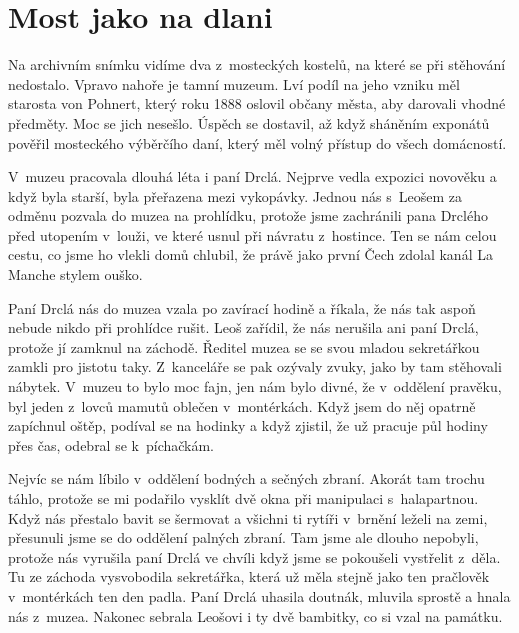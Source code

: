 
\chapter{Most jako na dlani}

Na archivním snímku vidíme dva z~mosteckých kostelů, na které se při stěhování
nedostalo. Vpravo nahoře je tamní muzeum. Lví podíl na jeho vzniku měl starosta
von Pohnert, který roku 1888 oslovil občany města, aby darovali vhodné
předměty. Moc se jich nesešlo. Úspěch se dostavil, až když sháněním exponátů
pověřil mosteckého výběrčího daní, který měl volný přístup do všech domácností.

V~muzeu pracovala dlouhá léta i paní Drclá. Nejprve vedla expozici novověku a
když byla starší, byla přeřazena mezi vykopávky. Jednou nás s~Leošem za odměnu
pozvala do muzea na prohlídku, protože jsme zachránili pana Drclého před
utopením v~louži, ve které usnul při návratu z~hostince. Ten se nám celou
cestu, co jsme ho vlekli domů chlubil, že právě jako první Čech zdolal kanál La
Manche stylem ouško.

Paní Drclá nás do muzea vzala po zavírací hodině a říkala, že nás tak aspoň
nebude nikdo při prohlídce rušit. Leoš zařídil, že nás nerušila ani paní Drclá,
protože jí zamknul na záchodě. Ředitel muzea se se svou mladou sekretářkou
zamkli pro jistotu taky. Z~kanceláře se pak ozývaly zvuky, jako by tam
stěhovali nábytek. V~muzeu to bylo moc fajn, jen nám bylo divné, že v~oddělení
pravěku, byl jeden z~lovců mamutů oblečen v~montérkách. Když jsem do něj
opatrně zapíchnul oštěp, podíval se na hodinky a když zjistil, že už pracuje
půl hodiny přes čas, odebral se k~píchačkám.

Nejvíc se nám líbilo v~oddělení bodných a sečných zbraní. Akorát tam trochu
táhlo, protože se mi podařilo vysklít dvě okna při manipulaci s~halapartnou.
Když nás přestalo bavit se šermovat a všichni ti rytíři v~brnění leželi na
zemi, přesunuli jsme se do oddělení palných zbraní. Tam jsme ale dlouho
nepobyli, protože nás vyrušila paní Drclá ve chvíli když jsme se pokoušeli
vystřelit z~děla. Tu ze záchoda vysvobodila sekretářka, která už měla stejně
jako ten pračlověk v~montérkách ten den padla. Paní Drclá uhasila doutnák,
mluvila sprostě a hnala nás z~muzea. Nakonec sebrala Leošovi i ty dvě bambitky,
co si vzal na památku.

